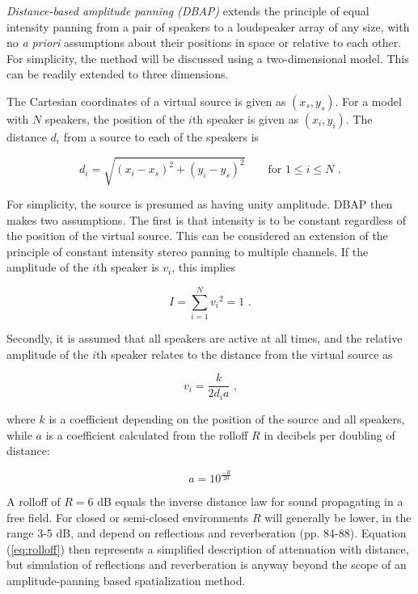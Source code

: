 \documentclass[twoside,10pt]{article}
\begin{document}
\textit{Distance-based amplitude panning (DBAP)} extends the principle of equal intensity panning from a pair of speakers to a loudspeaker array of any size, with no \textit{a priori} assumptions about their positions in space or relative to each other.
For simplicity, the method will be discussed using a two-dimensional model. This can be readily extended to three dimensions.

The Cartesian coordinates of a virtual source is given as $(x_{s}, y_{s})$. For a model with $N$ speakers, the position of the $i$th speaker is given as $(x_{i}, y_{i})$. The distance $d_{i}$ from a source to each of the speakers is

\begin{equation} \label{eq:distance}
d_{i} = \sqrt{ {(x_{i} - x_{s})}^2 + {(y_{i} - y_{s})}^2 } \qquad \textrm{for } 1 \leq i \leq N \textrm{ .}
\end{equation}

For simplicity, the source is presumed as having unity amplitude. DBAP then makes two assumptions. The first is that intensity is to be constant regardless of the position of the virtual source. This can be considered an extension of the principle of constant intensity stereo panning to multiple channels. If the amplitude of the $i$th speaker is $v_{i}$, this implies

\begin{equation} \label{eq:constant_intensity}
I = \sum_{i=1}^{N} {v_{i}}^2 = 1 \textrm{ .}
\end{equation}

Secondly, it is assumed that all speakers are active at all times, and the relative amplitude of the $i$th speaker relates to the distance from the virtual source as 

\begin{equation} \label{eq:inverse_distance}
v_{i} = \frac{k}{2 d_{i} a} \textrm{ ,}
\end{equation}

where $k$ is a coefficient depending on the position of the source and all speakers, while $a$ is a coefficient calculated from the rolloff $R$ in decibels per doubling of distance:

\begin{equation} \label{eq:rolloff}
	a = 10^{\frac{-R}{20}}
\end{equation}

A rolloff of $R = 6$ dB equals the inverse distance law for sound propagating in a free field. For closed or semi-closed environments $R$ will generally be lower, in the range 3-5 dB, and depend on reflections and reverberation \cite{Everest:2000handbook_acoustics} (pp. 84-88). Equation (\ref{eq:rolloff}) then represents a simplified description of attenuation with distance, but simulation of reflections and reverberation is anyway beyond the scope of an amplitude-panning based spatialization method.
\end{document}
